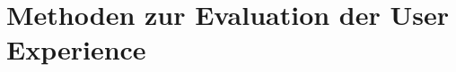 %
%




\section{Methoden zur Evaluation der User Experience} 
\label{Abschnitt:MethodenEvaluationUX}


%
%
%
%
%

